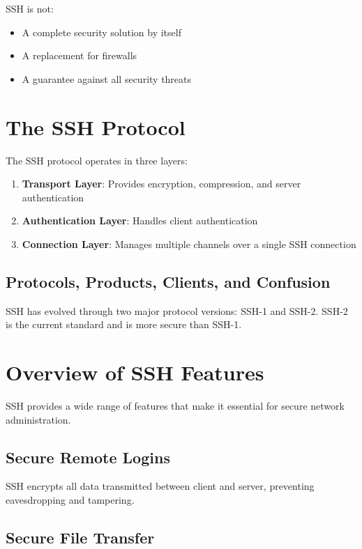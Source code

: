 \documentclass[12pt]{book}
\begin{document}
SSH is not:

\begin{itemize}
    \item A complete security solution by itself
    \item A replacement for firewalls
    \item A guarantee against all security threats
\end{itemize}

\section{The SSH Protocol}

The SSH protocol operates in three layers:

\begin{enumerate}
    \item \textbf{Transport Layer}: Provides encryption, compression, and server authentication
    \item \textbf{Authentication Layer}: Handles client authentication
    \item \textbf{Connection Layer}: Manages multiple channels over a single SSH connection
\end{enumerate}

\subsection{Protocols, Products, Clients, and Confusion}

SSH has evolved through two major protocol versions: SSH-1 and SSH-2. SSH-2 is the current standard and is more secure than SSH-1.

\section{Overview of SSH Features}

SSH provides a wide range of features that make it essential for secure network administration.

\subsection{Secure Remote Logins}

SSH encrypts all data transmitted between client and server, preventing eavesdropping and tampering.

\subsection{Secure File Transfer}
\end{document}
